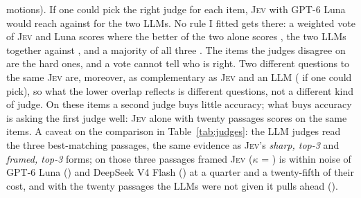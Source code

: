 \documentclass[11pt,a4paper]{article}
\newcommand{\jev}{\textsc{Jev}}
\begin{document}
motions). If one could pick the right judge for each item, \jev{} with GPT-6 Luna would reach \combOracleFramedThreeAndLuna{} against \combOracleLunaAndFlash{} for the two LLMs. No rule I fitted gets there: a weighted vote of \jev{} and Luna scores \combFitFramedThreeAndLuna{} where the better of the two alone scores \combSingleFramedThree{}, the two LLMs together \combFitLunaAndFlash{} against \combSingleFlash{}, and a majority of all three \combMajority{}. The items the judges disagree on are the hard ones, and a vote cannot tell who is right. Two different questions to the same \jev{} are, moreover, as complementary as \jev{} and an LLM (\combOracleFramedThreeAndDirectThree{} if one could pick), so what the lower overlap reflects is different questions, not a different kind of judge. On these items a second judge buys little accuracy; what buys accuracy is asking the first judge well: \jev{} alone with twenty passages scores \combSingleFramedTwoZero{} on the same items. A caveat on the comparison in Table~\ref{tab:judges}: the LLM judges read the three best-matching passages, the same evidence as \jev{}'s \emph{sharp, top-3} and \emph{framed, top-3} forms; on those three passages framed \jev{} ($\kappa$ = \kappaJevframedThreeZeroFive{}) is within noise of GPT-6 Luna (\kappaLLMgptSixluna{}) and DeepSeek V4 Flash (\kappaLLMdeepseekvFourflash{}) at a quarter and a twenty-fifth of their cost, and with the twenty passages the LLMs were not given it pulls ahead (\kappaJevframedTwoZeroZeroFive{}).
\end{document}
